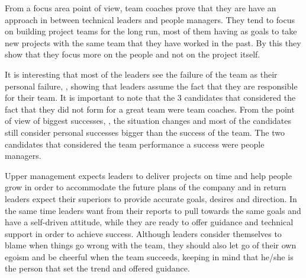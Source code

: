 From a focus area point of view, team coaches prove that they are have an approach in between technical leaders and people managers. They tend to focus on building project teams for the long run, most of them having as goals to take new projects with the same team that they have worked in the past. By this they show that they focus more on the people and not on the project itself.

It is interesting that most of the leaders see the failure of the team as their personal failure, , showing that leaders assume the fact that they are responsible for their team. It is important to note that the 3 candidates that considered the fact that they did not form for a great team were team coaches. From the point of view of biggest successes, , the situation changes and most of the candidates still consider personal successes bigger than the success of the team. The two candidates that considered the team performance a success were people managers.

Upper management expects leaders to deliver projects on time and help people grow in order to accommodate the future plans of the company and in return leaders expect their superiors to provide accurate goals, desires and direction. In the same time leaders want from their reports to pull towards the same goals and have a self-driven attitude, while they are ready to offer guidance and technical support in order to achieve success. Although leaders consider themselves to blame when things go wrong with the team, they should also let go of their own egoism and be cheerful when the team succeeds, keeping in mind that he/she is the person that set the trend and offered guidance. 